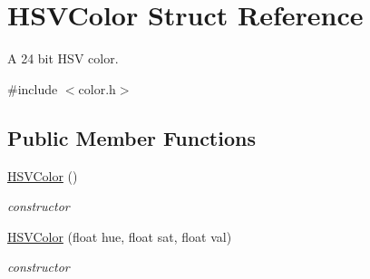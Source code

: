 \hypertarget{struct_h_s_v_color}{}\section{H\+S\+V\+Color Struct Reference}
\label{struct_h_s_v_color}


A 24 bit H\+SV color.  




{\ttfamily \#include $<$color.\+h$>$}

\subsection*{Public Member Functions}
\begin{DoxyCompactItemize}
\item 
\mbox{\label{struct_h_s_v_color_ab2cd8175fa87c007d9ae98d09ae39d9f}} 
\hyperlink{struct_h_s_v_color_ab2cd8175fa87c007d9ae98d09ae39d9f}{H\+S\+V\+Color} ()
\begin{DoxyCompactList}\small\item\em constructor \end{DoxyCompactList}\item 
\hyperlink{struct_h_s_v_color_a774e6af3f0c2fcf755c1cddaeac1c0d8}{H\+S\+V\+Color} (float hue, float sat, float val)
\begin{DoxyCompactList}\small\item\em constructor \end{DoxyCompactList}\end{DoxyCompactItemize}
